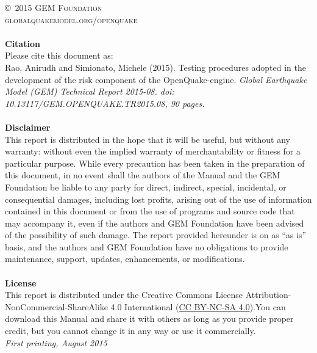 \documentclass[11pt,fleqn]{book} %
\begin{document}
\noindent \copyright\ \textsc{2015 GEM Foundation}\\ %
\noindent \textsc{globalquakemodel.org/openquake}\\ %
\noindent \hfill\\
\noindent
   {\textbf{Citation}} \hfill \\
   Please cite this document as: \hfill \\
   Rao, Anirudh and Simionato, Michele (2015). 
   Testing procedures adopted in the development of the risk 
   component of the OpenQuake-engine. 
   \textit{Global Earthquake Model (GEM) Technical Report 2015-08. 
   doi: 10.13117/GEM.OPENQUAKE.TR2015.08, 90 pages.} \hfill \\
\noindent \hfill\\
\noindent
   {\bf{Disclaimer}} \hfill \\
   This report is distributed in the hope that it will be useful, but without any warranty: without even the implied warranty of merchantability or fitness for a particular purpose. While every precaution has been taken in the preparation of this document, in no event shall the authors of the Manual and the GEM Foundation be liable to any party for direct, indirect, special, incidental, or consequential damages, including lost profits, arising out of the use of information contained in this document or from the use of programs and source code that may accompany it, even if the authors and GEM Foundation have been advised of the possibility of such damage. The report provided hereunder is on as ``as is'' basis, and the authors and GEM Foundation have no obligations to provide maintenance, support, updates, enhancements, or modifications. \hfill \\

\noindent \hfill\\
\noindent
   {\bf{License}} \hfill \\
   This report is distributed under the Creative Commons License Attribution-NonCommercial-ShareAlike 4.0 International (\href{http://creativecommons.org/licenses/by-nc-sa/4.0/}
   {CC BY-NC-SA 4.0}).You can download this Manual and share it with others as long as you provide proper credit, but you cannot change it in any way or use it commercially.\hfill \\

\noindent \textit{First printing, August 2015} %

\end{document}
